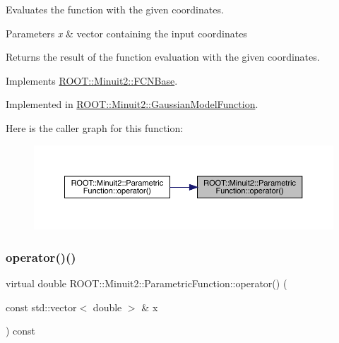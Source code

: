Evaluates the function with the given coordinates.


\begin{DoxyParams}{Parameters}
{\em x} & vector containing the input coordinates\\
\hline
\end{DoxyParams}
\begin{DoxyReturn}{Returns}
the result of the function evaluation with the given coordinates. 
\end{DoxyReturn}


Implements \mbox{\hyperlink{classROOT_1_1Minuit2_1_1FCNBase_ae4a86bd94d0d0f5ca6fc8f8ab2bb43cd}{R\+O\+O\+T\+::\+Minuit2\+::\+F\+C\+N\+Base}}.



Implemented in \mbox{\hyperlink{classROOT_1_1Minuit2_1_1GaussianModelFunction_af4102c5eecd496d63c5592f7519248ce}{R\+O\+O\+T\+::\+Minuit2\+::\+Gaussian\+Model\+Function}}.

Here is the caller graph for this function\+:\nopagebreak
\begin{figure}[H]
\begin{center}
\leavevmode
\includegraphics[width=350pt]{d3/d76/classROOT_1_1Minuit2_1_1ParametricFunction_a953426fa51c84cdef3eba24274131806_icgraph}
\end{center}
\end{figure}
\mbox{\label{classROOT_1_1Minuit2_1_1ParametricFunction_a953426fa51c84cdef3eba24274131806}} 
\subsubsection{\texorpdfstring{operator()()}{operator()()}\hspace{0.1cm}{\footnotesize\ttfamily [2/4]}}
{\footnotesize\ttfamily virtual double R\+O\+O\+T\+::\+Minuit2\+::\+Parametric\+Function\+::operator() (\begin{DoxyParamCaption}\item[{const std\+::vector$<$ double $>$ \&}]{x }\end{DoxyParamCaption}) const\hspace{0.3cm}{\ttfamily [pure virtual]}}


